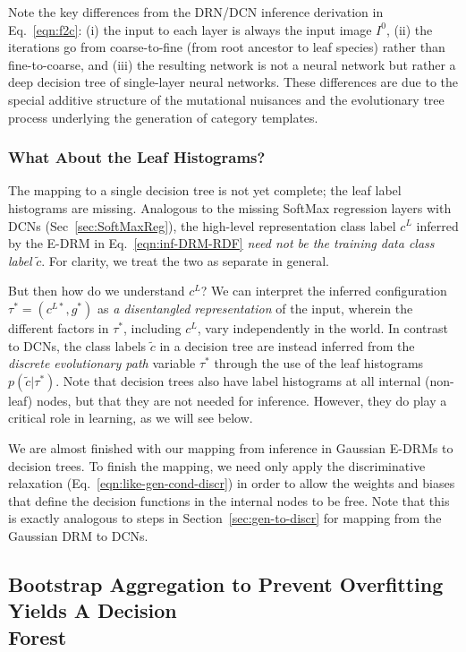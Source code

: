 \documentclass[12pt]{article}
\begin{document}
Note the key differences from the DRN/DCN inference derivation in Eq.~\ref{eqn:f2c}: (i) the input to each layer is always the input image $I^{0}$, (ii) the iterations go from coarse-to-fine (from root ancestor to leaf species) rather than fine-to-coarse, and (iii) the resulting network is not a neural network but rather a deep decision tree of single-layer neural networks. These differences are due to the special additive structure of the mutational nuisances and the evolutionary tree process underlying the generation of category templates.

\subsubsection{What About the Leaf Histograms?}

The mapping to a single decision tree is not yet complete; the leaf label histograms \cite{criminisi2013decision, breiman2001random} are missing. Analogous to the missing SoftMax regression layers with DCNs (Sec~\ref{sec:SoftMaxReg}), the high-level representation class label $c^{L}$ inferred by the E-DRM in Eq.~\ref{eqn:inf-DRM-RDF} \emph{need not be the training data class label} $\tilde{c}$. For clarity, we treat the two as separate in general. 

But then how do we understand $c^L$? We can interpret the inferred configuration $\tau^{*} = (c^{L*}, g^{*})$ as \emph{a disentangled representation} of the input, wherein the different factors in $\tau^*$, including $c^L$, vary independently in the world. In contrast to DCNs, the class labels $\tilde{c}$ in a decision tree are instead inferred from the \emph{discrete evolutionary path} variable $\tau^{*}$ through the use of the leaf histograms $p(\tilde{c} | \tau^{*})$. Note that decision trees also have label histograms at all internal (non-leaf) nodes, but that they are not needed for inference. However, they do play a critical role in learning, as we will see below.

We are almost finished with our mapping from inference in Gaussian E-DRMs to decision trees. To finish the mapping, we need only apply the discriminative relaxation (Eq.~\ref{eqn:like-gen-cond-discr}) in order to allow the weights and biases that define the decision functions in the internal nodes to be free. Note that this is exactly analogous to steps in Section~\ref{sec:gen-to-discr} for mapping from the Gaussian DRM to DCNs.

\subsection{Bootstrap Aggregation to Prevent Overfitting Yields A Decision \\ Forest}
\end{document}

